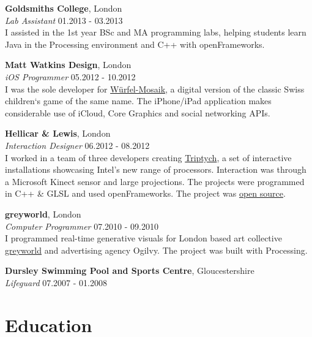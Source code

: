 \documentclass[margin,line,a4paper]{resume}
\begin{document}
\begin{resume}
\textbf{Goldsmiths College}, London \vspace{1mm}\\
\textsl{Lab Assistant} \hfill 01.2013 - 03.2013 \vspace{2mm} \\
I assisted in the 1st year BSc and MA programming labs, helping
students learn Java in the Processing environment and C++ with
openFrameworks.

\textbf{Matt Watkins Design}, London \vspace{1mm}\\
\textsl{iOS Programmer} \hfill 05.2012 - 10.2012 \vspace{2mm} \\
I was the sole developer for
\href{http://wurfelmosaik.com/}{W\"{u}rfel-Mosaik}, a digital version
of the classic Swiss children`s game of the same name. The iPhone/iPad
application makes considerable use of iCloud, Core Graphics and social
networking APIs.

\textbf{Hellicar \& Lewis}, London \vspace{1mm}\\
\textsl{Interaction Designer} \hfill 06.2012 - 08.2012 \vspace{2mm} \\
I worked in a team of three developers creating
\href{http://www.hellicarandlewis.com/2012/07/19/triptych}{Triptych},
a set of interactive installations showcasing Intel's new range of
processors. Interaction was through a Microsoft Kinect sensor and
large projections. The projects were programmed in C++ \& GLSL and
used openFrameworks. The project was
\href{https://github.com/HellicarAndLewis/Triptych}{open source}.

\textbf{greyworld}, London  \vspace{1mm}\\
\textsl{Computer Programmer} \hfill 07.2010 - 09.2010 \vspace{2mm} \\
I programmed real-time generative visuals for London
based art collective \href{http://greyworld.org}{greyworld} and
advertising agency Ogilvy. The project was built with Processing.

\textbf{Dursley Swimming Pool and Sports Centre}, Gloucestershire  \vspace{1mm}\\
\textsl{Lifeguard} \hfill 07.2007 - 01.2008


\section{\mysidestyle Education}


\end{resume}
\end{document}

